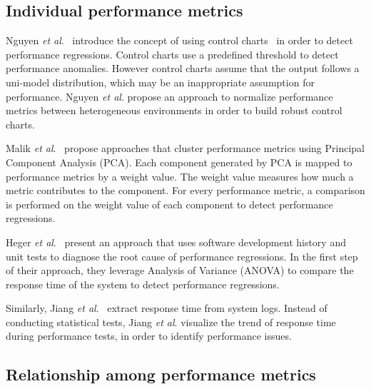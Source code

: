 \subsection{Individual performance metrics}
\label{sec:relatedindividual}
Nguyen \textit{et al$.$}~\cite{Nguyen:2012:ADP:2188286.2188344} introduce the concept of using control charts~\cite{shewhart1931economic} in order to detect performance regressions. Control charts use a predefined threshold to detect performance anomalies. However control charts assume that the output follows a uni-model distribution, which may be an inappropriate assumption for performance. Nguyen \textit{et al$.$} propose an approach to normalize performance metrics between heterogeneous environments in order to build robust control charts. %

Malik \emph{et al$.$}~\cite{Malik:2010:ACL:1955601.1955936, haroon} propose approaches that cluster performance metrics using Principal Component Analysis (PCA). Each component generated by PCA is mapped to performance metrics by a weight value. The weight value measures how much a metric contributes to the component. For every performance metric, a comparison is performed on the weight value of each component to detect performance regressions.

Heger \emph{et al$.$}~\cite{DBLP:conf/wosp/HegerHF13} present an approach that uses software development history and unit tests to diagnose the root cause of performance regressions. In the first step of their approach, they leverage Analysis of Variance (ANOVA) to compare the response time of the system to detect performance regressions. 

Similarly, Jiang \emph{et al$.$}~\cite{jackicsm2009} extract response time from system logs. Instead of conducting statistical tests, Jiang \emph{et al$.$} visualize the trend of response time during performance tests, in order to identify performance issues.


%



\subsection{Relationship among performance metrics}
\label{sec:relatedrelation}

